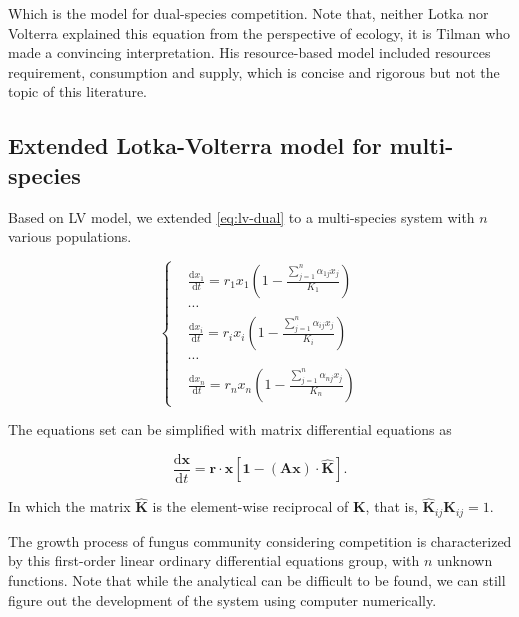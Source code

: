 Which is the model for dual-species competition. Note that, neither Lotka nor Volterra explained this equation from the perspective of ecology, it is Tilman who made a convincing interpretation. His resource-based model included resources requirement, consumption and supply, which is concise and rigorous but not the topic of this literature. \cite{Tilman}


\subsection{Extended Lotka-Volterra model for multi-species}

Based on LV model, we extended \eqref{eq:lv-dual} to a multi-species system with $n$ various populations.

\begin{equation}\label{eq:lv-multi}
    \left\{\begin{aligned}     &
    \frac{\mathrm{d}x_1}{\mathrm{d}t} =
    r_1x_1\left(1 - \frac{\sum_{j=1}^n \alpha_{1j}x_j}{K_1}\right) \\ & \cdots \\ &
    \frac{\mathrm{d}x_i}{\mathrm{d}t} =
    r_ix_i\left(1 - \frac{\sum_{j=1}^n \alpha_{ij}x_j}{K_i}\right) \\ & \cdots \\ &
    \frac{\mathrm{d}x_n}{\mathrm{d}t} =
    r_nx_n\left(1 - \frac{\sum_{j=1}^n \alpha_{nj}x_j}{K_n}\right)
    \end{aligned}\right.
\end{equation}

The equations set can be simplified with matrix differential equations as

\begin{equation}\label{eq:lv-mat}
    \frac{\mathrm{d}\boldsymbol{x}}{\mathrm{d}t} =
    \boldsymbol{r}\cdot\boldsymbol{x}
    \left[\boldsymbol{1} - (\boldsymbol{Ax})\cdot\hat{\boldsymbol{K}}\right].
\end{equation}

In which the matrix $\hat{\boldsymbol{K}}$ is the element-wise reciprocal of $\boldsymbol{K}$, that is, $\hat{\boldsymbol{K}}_{ij}\boldsymbol{K}_{ij} = 1$. 

The growth process of fungus community considering competition is characterized by this first-order linear ordinary differential equations group, with $n$ unknown functions. Note that while the analytical can be difficult to be found, we can still figure out the development of the system using computer numerically.

